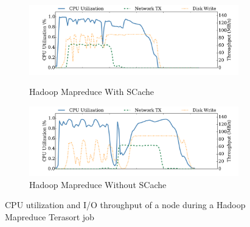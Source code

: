 \begin{figure}
	\centering
	\begin{minipage}[hb]{\linewidth}
		\begin{subfigure}{\linewidth}
			\begin{minipage}{\linewidth}
				\includegraphics[width=\linewidth]{fig/hadoop_terasort_scache}
				\caption{\color{blue}Hadoop Mapreduce With SCache}
				\label{fig:hadoop_terasort_scache}
			\end{minipage}
			\begin{minipage}{\linewidth}
				\includegraphics[width=\linewidth]{fig/hadoop_terasort_origin}
				\caption{\color{blue}Hadoop Mapreduce Without SCache}
				\label{fig:hadoop_terasort_origin}
			\end{minipage}
		\end{subfigure}
		\caption{\color{blue}CPU utilization and I/O throughput of a node during a Hadoop Mapreduce Terasort job}
		\label{fig:hadoop_terasort}
	\end{minipage}
\end{figure}

